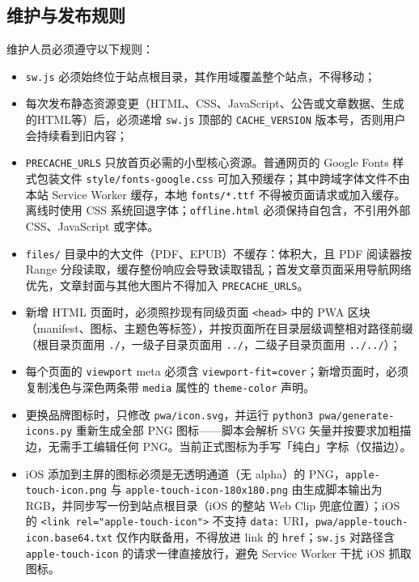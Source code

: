 \documentclass[fontset=fandol]{ctexrep}
\begin{document}
\subsection{维护与发布规则}

{\heiti 维护人员必须遵守以下规则：}

\begin{itemize}
	\item{\verb|sw.js| 必须始终位于站点根目录，其作用域覆盖整个站点，不得移动；}
	\item{每次发布静态资源变更（HTML、CSS、JavaScript、公告或文章数据、生成的HTML等）后，必须递增 \verb|sw.js| 顶部的 \verb|CACHE_VERSION| 版本号，否则用户会持续看到旧内容；}
	\item{\verb|PRECACHE_URLS| 只放首页必需的小型核心资源。普通网页的 Google Fonts 样式包装文件 \verb|style/fonts-google.css| 可加入预缓存；其中跨域字体文件不由本站 Service Worker 缓存，本地 \verb|fonts/*.ttf| 不得被页面请求或加入缓存。离线时使用 CSS 系统回退字体；\verb|offline.html| 必须保持自包含，不引用外部 CSS、JavaScript 或字体。}
	\item{\verb|files/| 目录中的大文件（PDF、EPUB）不缓存：体积大，且 PDF 阅读器按 Range 分段读取，缓存整份响应会导致读取错乱；首发文章页面采用导航网络优先，文章封面与其他大图片不得加入 \verb|PRECACHE_URLS|。}
	\item{新增 HTML 页面时，必须照抄现有同级页面 \verb|<head>| 中的 PWA 区块（manifest、图标、主题色等标签），并按页面所在目录层级调整相对路径前缀（根目录页面用 \verb|./|，一级子目录页面用 \verb|../|，二级子目录页面用 \verb|../../|）；}
	\item{每个页面的 \verb|viewport| meta 必须含 \verb|viewport-fit=cover|；新增页面时，必须复制浅色与深色两条带 \verb|media| 属性的 \verb|theme-color| 声明。}
	\item{更换品牌图标时，只修改 \verb|pwa/icon.svg|，并运行 \verb|python3 pwa/generate-icons.py| 重新生成全部 PNG 图标——脚本会解析 SVG 矢量并按要求加粗描边，无需手工编辑任何 PNG。当前正式图标为手写「纯白」字标（仅描边）。}
	\item{iOS 添加到主屏的图标必须是无透明通道（无 alpha）的 PNG，\verb|apple-touch-icon.png| 与 \verb|apple-touch-icon-180x180.png| 由生成脚本输出为 RGB，并同步写一份到站点根目录（iOS 的整站 Web Clip 兜底位置）；iOS 的 \verb|<link rel="apple-touch-icon">| 不支持 \verb|data:| URI，\verb|pwa/apple-touch-icon.base64.txt| 仅作内联备用，不得放进 link 的 \verb|href|；\verb|sw.js| 对路径含 \verb|apple-touch-icon| 的请求一律直接放行，避免 Service Worker 干扰 iOS 抓取图标。}
\end{itemize}
\end{document}

